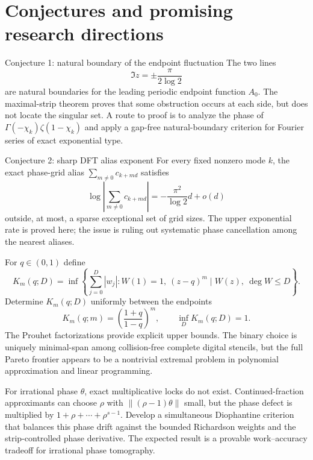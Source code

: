 \documentclass[11pt]{article}
\numberwithin{equation}{section}
\theoremstyle{definition}
\theoremstyle{remark}
\begin{document}
\section{Conjectures and promising research directions}
\label{p6:sec:open}

\begin{conjecturebox}{Conjecture 1: natural boundary of the endpoint fluctuation}
The two lines
\[
 \Im z=\pm\frac{\pi}{2\log2}
\]
are natural boundaries for the leading periodic endpoint function $A_0$.  The maximal-strip
theorem proves that some obstruction occurs at each side, but does not locate the singular
set.  A route to proof is to analyze the phase of
$\Gamma(-\chi_k)\zeta(1-\chi_k)$ and apply a gap-free natural-boundary criterion for Fourier
series of exact exponential type.
\end{conjecturebox}

\begin{conjecturebox}{Conjecture 2: sharp DFT alias exponent}
For every fixed nonzero mode $k$, the exact phase-grid alias
$\sum_{m\ne0}c_{k+md}$ satisfies
\[
 \log\left|\sum_{m\ne0}c_{k+md}\right|
 =-\frac{\pi^2}{\log2}d+o(d)
\]
outside, at most, a sparse exceptional set of grid sizes.  The upper exponential rate is
proved here; the issue is ruling out systematic phase cancellation among the nearest aliases.
\end{conjecturebox}

\begin{problem}
For $q\in(0,1)$ define
\[
 K_m(q;D)=\inf\left\{\sum_{j=0}^{D}|w_j|:
 W(1)=1,\ (z-q)^m\mid W(z),\ \deg W\le D\right\}.
\]
Determine $K_m(q;D)$ uniformly between the endpoints
\[
 K_m(q;m)=\left(\frac{1+q}{1-q}\right)^m,
 \qquad
 \inf_DK_m(q;D)=1.
\]
The Prouhet factorizations provide explicit upper bounds.  The binary choice is uniquely
minimal-span among collision-free complete digital stencils, but the full Pareto frontier
appears to be a nontrivial extremal problem in polynomial approximation and linear
programming.
\end{problem}

\begin{problem}
For irrational phase $\theta$, exact multiplicative locks do not exist.  Continued-fraction
approximants can choose $\rho$ with $\|(\rho-1)\theta\|$ small, but the phase defect is
multiplied by $1+\rho+\cdots+\rho^{s-1}$.  Develop a simultaneous Diophantine criterion that
balances this phase drift against the bounded Richardson weights and the strip-controlled
phase derivative.  The expected result is a provable work--accuracy tradeoff for irrational
phase tomography.
\end{problem}
\end{document}
